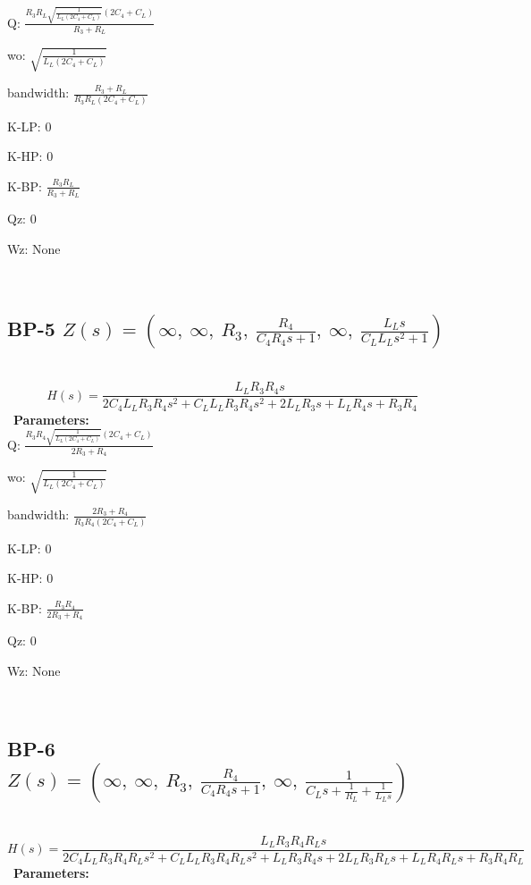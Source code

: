\documentclass{article}
\begin{document}
Q: $\frac{R_{3} R_{L} \sqrt{\frac{1}{L_{L} \left(2 C_{4} + C_{L}\right)}} \left(2 C_{4} + C_{L}\right)}{R_{3} + R_{L}}$\ 

wo: $\sqrt{\frac{1}{L_{L} \left(2 C_{4} + C_{L}\right)}}$\ 

bandwidth: $\frac{R_{3} + R_{L}}{R_{3} R_{L} \left(2 C_{4} + C_{L}\right)}$\ 

K-LP: $0$\ 

K-HP: $0$\ 

K-BP: $\frac{R_{3} R_{L}}{R_{3} + R_{L}}$\ 

Qz: $0$\ 

Wz: $\text{None}$\ 

\ 

\subsection{BP-5 $Z(s) = \left( \infty, \  \infty, \  R_{3}, \  \frac{R_{4}}{C_{4} R_{4} s + 1}, \  \infty, \  \frac{L_{L} s}{C_{L} L_{L} s^{2} + 1}\right)$ } \ 
\textbf{\[H(s) = \frac{L_{L} R_{3} R_{4} s}{2 C_{4} L_{L} R_{3} R_{4} s^{2} + C_{L} L_{L} R_{3} R_{4} s^{2} + 2 L_{L} R_{3} s + L_{L} R_{4} s + R_{3} R_{4}}\] } \ 
\textbf{Parameters:}\\ 

Q: $\frac{R_{3} R_{4} \sqrt{\frac{1}{L_{L} \left(2 C_{4} + C_{L}\right)}} \left(2 C_{4} + C_{L}\right)}{2 R_{3} + R_{4}}$\ 

wo: $\sqrt{\frac{1}{L_{L} \left(2 C_{4} + C_{L}\right)}}$\ 

bandwidth: $\frac{2 R_{3} + R_{4}}{R_{3} R_{4} \left(2 C_{4} + C_{L}\right)}$\ 

K-LP: $0$\ 

K-HP: $0$\ 

K-BP: $\frac{R_{3} R_{4}}{2 R_{3} + R_{4}}$\ 

Qz: $0$\ 

Wz: $\text{None}$\ 

\ 

\subsection{BP-6 $Z(s) = \left( \infty, \  \infty, \  R_{3}, \  \frac{R_{4}}{C_{4} R_{4} s + 1}, \  \infty, \  \frac{1}{C_{L} s + \frac{1}{R_{L}} + \frac{1}{L_{L} s}}\right)$ } \ 
\textbf{\[H(s) = \frac{L_{L} R_{3} R_{4} R_{L} s}{2 C_{4} L_{L} R_{3} R_{4} R_{L} s^{2} + C_{L} L_{L} R_{3} R_{4} R_{L} s^{2} + L_{L} R_{3} R_{4} s + 2 L_{L} R_{3} R_{L} s + L_{L} R_{4} R_{L} s + R_{3} R_{4} R_{L}}\] } \ 
\textbf{Parameters:}\\ 
\end{document}

